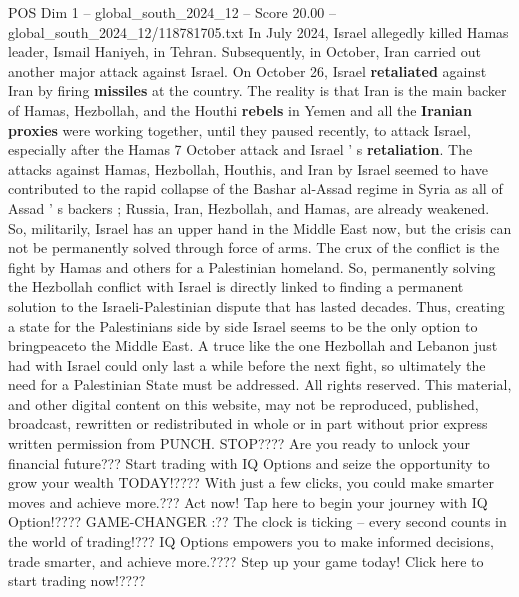 \begin{textsample}{POS Dim 1 – global\_south\_2024\_12 – Score 20.00 – global\_south\_2024\_12/118781705.txt}
In July 2024, Israel allegedly killed Hamas leader, Ismail Haniyeh, in Tehran.
Subsequently, in October, Iran carried out another major attack against Israel.
On October 26, Israel \textbf{retaliated} against Iran by firing \textbf{missiles} at the country.
The reality is that Iran is the main backer of Hamas, Hezbollah, and the Houthi \textbf{rebels} in Yemen and all the \textbf{Iranian} \textbf{proxies} were working together, until they paused recently, to attack Israel, especially after the Hamas 7 October attack and Israel ' s \textbf{retaliation}.
The attacks against Hamas, Hezbollah, Houthis, and Iran by Israel seemed to have contributed to the rapid collapse of the Bashar al-Assad regime in Syria as all of Assad ' s backers ; Russia, Iran, Hezbollah, and Hamas, are already weakened.
So, militarily, Israel has an upper hand in the Middle East now, but the crisis can not be permanently solved through force of arms.
The crux of the conflict is the fight by Hamas and others for a Palestinian homeland.
So, permanently solving the Hezbollah conflict with Israel is directly linked to finding a permanent solution to the Israeli-Palestinian dispute that has lasted decades.
Thus, creating a state for the Palestinians side by side Israel seems to be the only option to bringpeaceto the Middle East.
A truce like the one Hezbollah and Lebanon just had with Israel could only last a while before the next fight, so ultimately the need for a Palestinian State must be addressed.
All rights reserved.
This material, and other digital content on this website, may not be reproduced, published, broadcast, rewritten or redistributed in whole or in part without prior express written permission from PUNCH.
STOP????
Are you ready to unlock your financial future???
Start trading with IQ Options and seize the opportunity to grow your wealth TODAY!????
With just a few clicks, you could make smarter moves and achieve more.???
Act now!
Tap here to begin your journey with IQ Option!????
GAME-CHANGER :??
The clock is ticking -- every second counts in the world of trading!???
IQ Options empowers you to make informed decisions, trade smarter, and achieve more.????
Step up your game today!
Click here to start trading now!????

\end{textsample}

